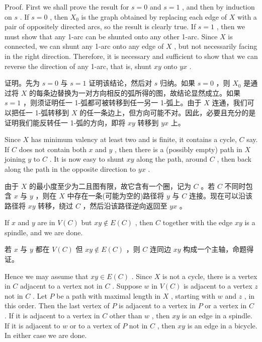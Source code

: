 \documentclass[10pt]{article}
\begin{document}
Proof. First we shall prove the result for \(s = 0\) and \(s = 1\) , and then by induction on \(s\) . If \(s = 0\) , then \({X}_{0}\) is the graph obtained by replacing each edge of \(X\) with a pair of oppositely directed arcs, so the result is clearly true. If \(s = 1\) , then we must show that any 1-arc can be shunted onto any other 1-arc. Since \(X\) is connected, we can shunt any 1-arc onto any edge of \(X\) , but not necessarily facing in the right direction. Therefore, it is necessary and sufficient to show that we can reverse the direction of any 1-arc, that is, shunt \({xy}\) onto \({yx}\) .

\begin{tcolorbox}\relax
证明。先为 \(s = 0\) 与 \(s = 1\) 证明该结论，然后对 \(s\) 归纳。如果 \(s = 0\) ，则 \({X}_{0}\) 是通过将 \(X\) 的每条边替换为一对方向相反的弧所得的图，故结论显然成立。如果 \(s = 1\) ，则须证明任一 1-弧都可被转移到任一另一 1-弧上。由于 \(X\) 连通，我们可以把任一 1-弧转移到 \(X\) 的任一条边上，但方向可能不对。因此，必要且充分的是证明我们能反转任一 1-弧的方向，即将 \({xy}\) 转移到 \({yx}\) 上。
\end{tcolorbox}

Since \(X\) has minimum valency at least two and is finite, it contains a cycle, \(C\) say. If \(C\) does not contain both \(x\) and \(y\) , then there is a (possibly empty) path in \(X\) joining \(y\) to \(C\) . It is now easy to shunt \({xy}\) along the path, around \(C\) , then back along the path in the opposite direction to \({yx}\) .

\begin{tcolorbox}\relax
由于 \(X\) 的最小度至少为二且图有限，故它含有一个圈，记为 \(C\) 。若 \(C\) 不同时包含 \(x\) 与 \(y\) ，则在 \(X\) 中存在一条(可能为空的)路径将 \(y\) 与 \(C\) 连接。现在可以沿该路径将 \({xy}\) 转移，绕过 \(C\) ，然后沿该路径逆向返回至 \({yx}\) 。
\end{tcolorbox}

If \(x\) and \(y\) are in \(V\left( C\right)\) but \({xy} \notin  E\left( C\right)\) , then \(C\) together with the edge \({xy}\) is a spindle, and we are done.

\begin{tcolorbox}\relax
若 \(x\) 与 \(y\) 都在 \(V\left( C\right)\) 但 \({xy} \notin  E\left( C\right)\) ，则 \(C\) 连同边 \({xy}\) 构成一个主轴，命题得证。
\end{tcolorbox}

Hence we may assume that \({xy} \in  E\left( C\right)\) . Since \(X\) is not a cycle, there is a vertex in \(C\) adjacent to a vertex not in \(C\) . Suppose \(w\) in \(V\left( C\right)\) is adjacent to a vertex \(z\) not in \(C\) . Let \(P\) be a path with maximal length in \(X\) , starting with \(w\) and \(z\) , in this order. Then the last vertex of \(P\) is adjacent to a vertex in \(P\) or a vertex in \(C\) . If it is adjacent to a vertex in \(C\) other than \(w\) , then \({xy}\) is an edge in a spindle. If it is adjacent to \(w\) or to a vertex of \(P\) not in \(C\) , then \({xy}\) is an edge in a bicycle. In either case we are done.
\end{document}
